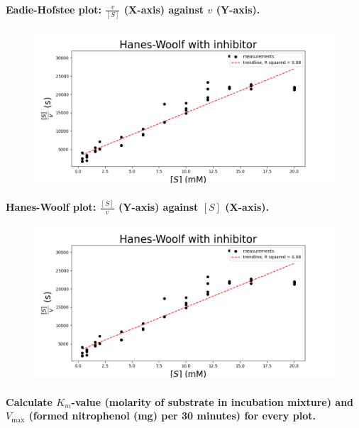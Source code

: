 \documentclass[a4paper,12pt]{article}
\begin{document}
\paragraph{Eadie-Hofstee plot: $\frac{v}{[S]}$ (X-axis) against $v$ (Y-axis).}

\begin{figure}[h!]
    \includegraphics[scale=0.4]{fig3_4.png}
    \centering
\end{figure}

\paragraph{Hanes-Woolf plot: $\frac{[S]}{v}$ (Y-axis) against $[S]$ (X-axis).}

\begin{figure}[h!]
    \includegraphics[scale=0.4]{fig3_4.png}
    \centering
\end{figure}

\paragraph{Calculate $K_m$-value (molarity of substrate in incubation mixture) and $V_{\text{max}}$ (formed nitrophenol (mg) per 30 minutes) for every plot.}
\end{document}
